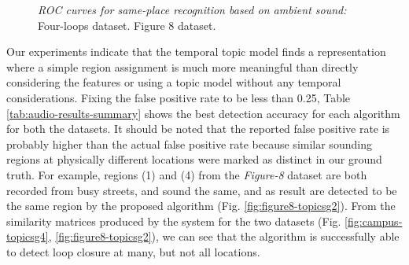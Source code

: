 \begin{figure}
\begin{center}


\caption{ \emph{ROC curves for same-place recognition based on ambient sound:}
\protect{} Four-loops dataset.
\protect{} Figure 8 dataset.
}
\label{fig:audio-roc-top1}
\end{center}
\end{figure}

Our experiments indicate that the temporal topic model finds a representation where a simple region assignment is much more meaningful than directly considering the features or using a topic model without any temporal considerations. Fixing the false positive rate to be less than 0.25, Table \ref{tab:audio-results-summary} shows the best detection accuracy for each algorithm for both the datasets. It should be noted that the reported false positive rate is probably higher than the actual false positive rate because similar sounding regions at physically different locations were marked as distinct in our ground truth. For example, regions (1) and (4) from the \emph{Figure-8} dataset are both recorded from busy streets, and sound the same, and as result are detected to be the same region by the proposed algorithm (Fig. \ref{fig:figure8-topicsg2}). From the similarity matrices produced by the system for the two datasets (Fig. \ref{fig:campus-topicsg4}, \ref{fig:figure8-topicsg2}), we can see that the algorithm is successfully able to detect loop closure at many, but not all locations.

